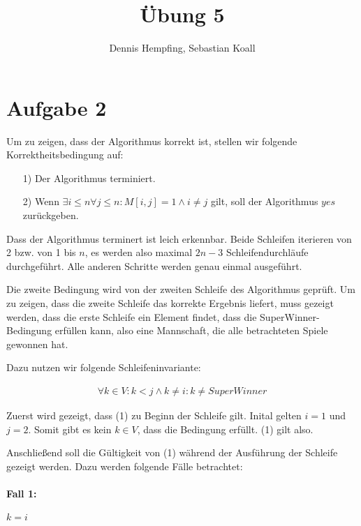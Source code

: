 \documentclass[12pt]{scrartcl}%
\theoremstyle{nonumberplain}
\begin{document}
\author{Dennis Hempfing, Sebastian Koall}
\title{Übung 5}
\date{} 
\pagestyle{myheadings}

\maketitle %

\section*{Aufgabe 2}

Um zu zeigen, dass der Algorithmus korrekt ist, stellen wir folgende Korrektheitsbedingung auf:

\begin{itemize}
	\item[1)] Der Algorithmus terminiert.
	\item[2)] Wenn $\exists i \le n \forall j \le n: M[i,j] = 1 \wedge i \not= j$ gilt, soll der Algorithmus $yes$ zurückgeben.\\
\end{itemize}

Dass der Algorithmus terminert ist leich erkennbar. Beide Schleifen iterieren von 2 bzw. von 1 bis $n$, es werden also maximal $2n-3$ Schleifendurchläufe durchgeführt. Alle anderen Schritte werden genau einmal ausgeführt. 

Die zweite Bedingung wird von der zweiten Schleife des Algorithmus geprüft. Um zu zeigen, dass die zweite Schleife das korrekte Ergebnis liefert, muss gezeigt werden, dass die erste Schleife ein Element findet, dass die SuperWinner-Bedingung erfüllen kann, also eine Mannschaft, die alle betrachteten Spiele gewonnen hat.

Dazu nutzen wir folgende Schleifeninvariante:

\begin{align}
	\forall k \in V: k < j \wedge k \not= i: k \not= SuperWinner
\end{align}

Zuerst wird gezeigt, dass (1) zu Beginn der Schleife gilt. Inital gelten $i=1$ und $j=2$. Somit gibt es kein $k \in V$, dass die Bedingung erfüllt. (1) gilt also.

Anschließend soll die Gültigkeit von (1) während der Ausführung der Schleife gezeigt werden. Dazu werden folgende Fälle betrachtet:

\paragraph{Fall 1:} $k = i$
\end{document}
